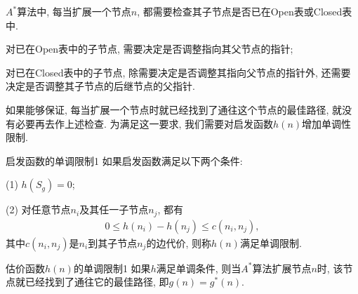 \begin{remark}
    $A^*$算法中, 每当扩展一个节点$n$, 都需要检查其子节点是否已在Open表或Closed表中.
\end{remark}

 对已在Open表中的子节点, 需要决定是否调整指向其父节点的指针;

 对已在Closed表中的子节点, 除需要决定是否调整其指向父节点的指针外, 还需要决定是否调整其子节点的后继节点的父指针.

如果能够保证, 每当扩展一个节点时就已经找到了通往这个节点的最佳路径, 就没有必要再去作上述检查.
为满足这一要求, 我们需要对启发函数$h(n)$增加单调性限制.
\begin{mydef}{启发函数的单调限制}{1}
如果启发函数满足以下两个条件:

(1) $h(S_g)=0$;

(2) 对任意节点$n_i$及其任一子节点$n_j$, 都有
\begin{align}
    0\leq h(n_i)-h(n_j)\leq c(n_i, n_j),
\end{align}
其中$c(n_i, n_j)$是$n_i$到其子节点$n_j$的边代价, 则称$h(n)$满足单调限制. 
\end{mydef}
\begin{mythm}{估价函数$h(n)$的单调限制}{1}
    如果$h$满足单调条件, 则当$A^*$算法扩展节点$n$时, 该节点就已经找到了通往它的最佳路径, 即$g(n)=g^*(n)$.
\end{mythm}
